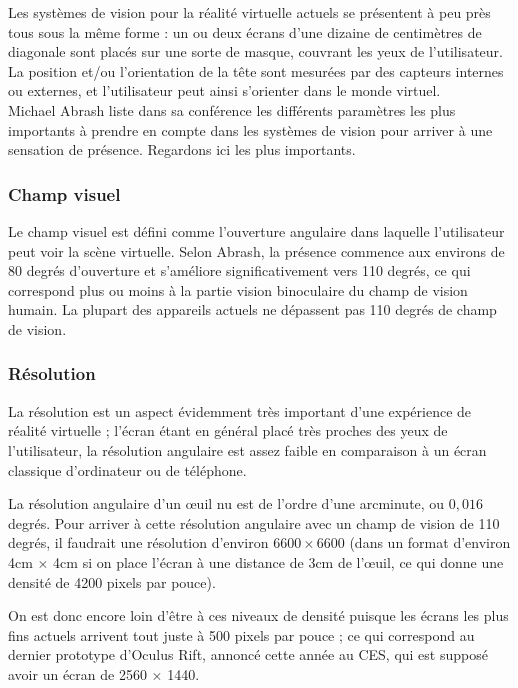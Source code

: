 \documentclass[a4,12pt]{scrartcl}
\begin{document}
Les systèmes de vision pour la réalité virtuelle actuels se présentent à peu près tous sous la même forme : un ou deux écrans d’une dizaine de centimètres de diagonale sont placés sur une sorte de masque, couvrant les yeux de l’utilisateur. La position et/ou l’orientation de la tête sont mesurées par des capteurs internes ou externes, et l’utilisateur peut ainsi s’orienter dans le monde virtuel.\\

Michael Abrash liste dans sa conférence \cite{Abrash14} les différents paramètres les plus importants à prendre en compte dans les systèmes de vision pour arriver à une sensation de présence. Regardons ici les plus importants.

\subsubsection{Champ visuel}

Le champ visuel est défini comme l'ouverture angulaire dans laquelle l'utilisateur peut voir la scène virtuelle. Selon Abrash, la présence commence aux environs de 80 degrés d'ouverture et s'améliore significativement vers 110 degrés, ce qui correspond plus ou moins à la partie vision binoculaire du champ de vision humain. La plupart des appareils actuels ne dépassent pas 110 degrés de champ de vision.

\subsubsection{Résolution}

La résolution est un aspect évidemment très important d'une expérience de réalité virtuelle ; l'écran étant en général placé très proches des yeux de l'utilisateur, la résolution angulaire est assez faible en comparaison à un écran classique d'ordinateur ou de téléphone.

La résolution angulaire d'un \oe{}uil nu est de l'ordre d'une arcminute, ou $0,016$ degrés. Pour arriver à cette résolution angulaire avec un champ de vision de 110 degrés, il faudrait une résolution d'environ $6600 \times 6600$ (dans un format d'environ 4cm $\times$ 4cm si on place l'écran à une distance de 3cm de l'\oe{}uil, ce qui donne une densité de 4200 pixels par pouce).

On est donc encore loin d'être à ces niveaux de densité puisque les écrans les plus fins actuels arrivent tout juste à 500 pixels par pouce ; ce qui correspond au dernier prototype d'Oculus Rift, annoncé cette année au CES, qui est supposé avoir un écran de 2560 $\times$ 1440.
\end{document}
